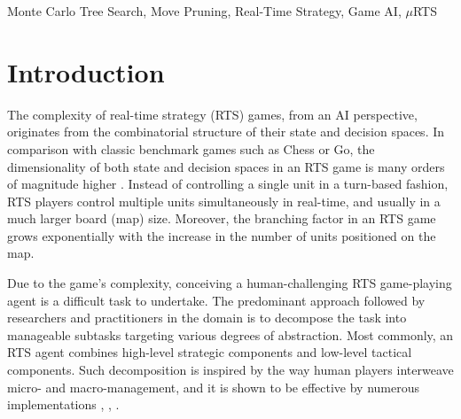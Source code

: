 \documentclass[conference]{IEEEtran}
\newcommand{\mRTS}{$\mu$RTS}
\begin{document}
\begin{abstract}
The impressive performance of Monte Carlo Tree Search (MCTS) based game-playing agents in high branching-factor domains such as Go, motivated researchers to apply and adapt MCTS to even more challenging domains. Real-time strategy (RTS) games feature a large combinatorial branching factor and a real-time aspect that pose significant challenges to a broad spectrum of AI techniques, including MCTS. Various MCTS enhancements were proposed, such as the combinatorial multi-armed bandit (CMAB) based sampling, state/action abstractions, and machine learning. In this paper, we propose to employ move pruning as a way to improve the performance of MCTS-based agents in the context of RTS games. We describe a class of possibly detrimental player-actions and propose several pruning approaches targeting it. The experimentation results in \mRTS{} indicate that this could be a promising direction.
\end{abstract}

\begin{IEEEkeywords}
Monte Carlo Tree Search, Move Pruning, Real-Time Strategy, Game AI, \mRTS{}
\end{IEEEkeywords}



\section{Introduction}
\label{sec:introduction}

The complexity of real-time strategy (RTS) games, from an AI perspective, originates from the combinatorial structure of their state and decision spaces. In comparison with classic benchmark games such as Chess or Go, the dimensionality of both state and decision spaces in an RTS game is many orders of magnitude higher \cite{ontanon_survey_2013}. Instead of controlling a single unit in a turn-based fashion, RTS players control multiple units simultaneously in real-time, and usually in a much larger board (map) size. Moreover, the branching factor in an RTS game grows exponentially with the increase in the number of units positioned on the map.

Due to the game's complexity, conceiving a human-challenging RTS game-playing agent is a difficult task to undertake. The predominant approach followed by researchers and practitioners in the domain is to decompose the task into manageable subtasks targeting various degrees of abstraction. Most commonly, an RTS agent combines high-level strategic components and low-level tactical components. Such decomposition is inspired by the way human players interweave micro- and macro-management, and it is shown to be effective by numerous implementations \cite{barriga_combining_2017}, \cite{moraes_asymmetric_2018}, \cite{neufeld_hybrid_2019}. 
\end{document}
